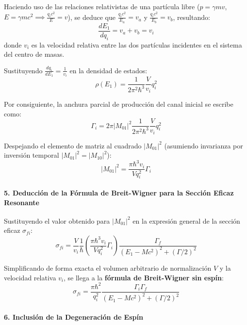 Haciendo uso de las relaciones relativistas de una partícula libre ($p = \gamma m v$, $E = \gamma m c^2 \implies \frac{q_i c^2}{E} = v$), se deduce que $\frac{q_i c^2}{E_a} = v_a$ y $\frac{q_i c^2}{E_b} = v_b$, resultando:
\begin{equation}
\frac{dE_1}{dq_i} = v_a + v_b = v_i
\end{equation}
donde $v_i$ es la velocidad relativa entre las dos partículas incidentes en el sistema del centro de masas.

Sustituyendo $\frac{dq_i}{dE_1} = \frac{1}{v_i}$ en la densidad de estados:
\begin{equation}
\rho(E_1) = \frac{1}{2\pi^2 \hbar^3} \frac{V}{v_i} q_i^2
\end{equation}

Por consiguiente, la anchura parcial de producción del canal inicial se escribe como:
\begin{equation}
\Gamma_i = 2\pi |M_{01}|^2 \frac{1}{2\pi^2 \hbar^3} \frac{V}{v_i} q_i^2
\end{equation}

Despejando el elemento de matriz al cuadrado $|M_{01}|^2$ (asumiendo invarianza por inversión temporal $|M_{01}|^2 = |M_{10}|^2$):
\begin{equation}
|M_{01}|^2 = \frac{\pi \hbar^3 v_i}{V q_i^2} \Gamma_i
\end{equation}

\paragraph{5. Deducción de la Fórmula de Breit-Wigner para la Sección Eficaz Resonante}

Sustituyendo el valor obtenido para $|M_{01}|^2$ en la expresión general de la sección eficaz $\sigma_{fi}$:
\begin{equation}
\sigma_{fi} = \frac{V}{v_i} \frac{1}{\hbar} \left( \frac{\pi \hbar^3 v_i}{V q_i^2} \Gamma_i \right) \frac{\Gamma_f}{(E_1 - M c^2)^2 + (\Gamma / 2)^2}
\end{equation}

Simplificando de forma exacta el volumen arbitrario de normalización $V$ y la velocidad relativa $v_i$, se llega a la \textbf{fórmula de Breit-Wigner sin espín}:
\begin{equation}
\sigma_{fi} = \frac{\pi \hbar^2}{q_i^2} \frac{\Gamma_i \Gamma_f}{(E_1 - M c^2)^2 + (\Gamma / 2)^2}
\end{equation}

\paragraph{6. Inclusión de la Degeneración de Espín}

